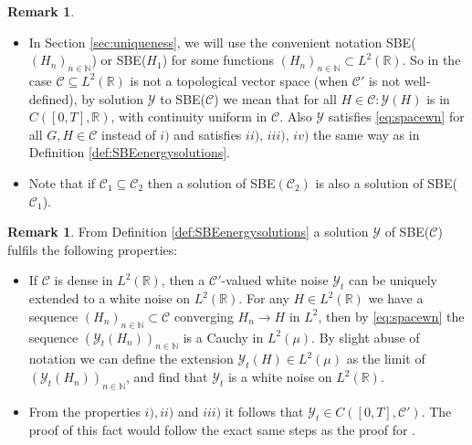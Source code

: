 \documentclass[a4paper, reqno, 12pt]{amsart}
\theoremstyle{plain}
\theoremstyle{definition}
\newtheorem{remark}[definition]{Remark}
\newcommand{\R}{\mathbb{R}}
\newcommand{\N}{\mathbb{N}}
\begin{document}
\begin{remark} 
\label{rem:sbenotation}

\phantom{a}

\begin{itemize} 
    \item[1.]In Section \ref{sec:uniqueness}, we will use the convenient notation SBE($(H_n)_{n\in\N}$) or SBE($H_1$) for some functions $(H_n)_{n\in\N}\subset L^2(\R)$. So in the case $\mathcal C\subseteq L^2(\R)$ is not a topological vector space (when $\mathcal C'$ is not well-defined), by solution $\mathcal Y$ to SBE($\mathcal C$) we mean that for all $H\in\mathcal C: \mathcal Y(H)$ is in $ C([0,T],\R)$, with continuity uniform in $\mathcal C$. Also $\mathcal Y$ satisfies \eqref{eq:spacewn} for all $G,H\in\mathcal C$ instead of $i)$ and satisfies $ii)$, $iii)$, $iv)$ the same way as in Definition \ref{def:SBEenergysolutions}.
    \item[2.] Note that if $ \mathcal C_1\subseteq \mathcal C_2$ then a solution of SBE$(\mathcal C_2)$ is also a solution of SBE($\mathcal C_1$).
\end{itemize}
\end{remark}

\begin{remark}\label{rem:continuity&whitenoise}
From Definition \ref{def:SBEenergysolutions}  a solution $\mathcal Y$ of SBE($\mathcal C$) fulfils the following properties:
\begin{itemize}
    \item[1.] If $\mathcal C$ is dense in $L^2(\R)$, then a $\mathcal{C'}$-valued white noise $\mathcal Y_t$ can be uniquely extended to a white noise on $L^2(\R)$. For any $H\in L^2(\R)$ we have a sequence $(H_n)_{n\in\N}\subset \mathcal C$ converging $H_n\to H$ in $L^2$, then by \eqref{eq:spacewn} the sequence $(\mathcal Y_t(H_n))_{n\in\N}$ is a Cauchy in $L^2(\mu)$. By slight abuse of notation we can define the extension $\mathcal Y_t(H)\in L^2(\mu)$ as the limit of $(\mathcal Y_t(H_n))_{n\in\N}$, and find that $\mathcal Y_t$ is a white noise on $L^2(\R)$.
    \item[2.] From the properties $i),ii)$ and $iii)$ it follows that $\mathcal Y_t\in C([0,T],\mathcal C')$. The proof of this fact would follow the exact same steps as the proof for \cite[Theorem 2]{GJ14}.
\end{itemize}
\end{remark}
\end{document}
